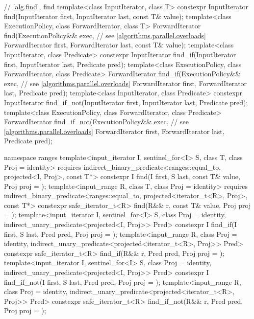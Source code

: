 \begin{codeblock}
{  // \ref{alg.find}, find
  template<class InputIterator, class T>
    constexpr InputIterator find(InputIterator first, InputIterator last,
                                 const T& value);
  template<class ExecutionPolicy, class ForwardIterator, class T>
    ForwardIterator find(ExecutionPolicy&& exec,                // see \ref{algorithms.parallel.overloads}
                         ForwardIterator first, ForwardIterator last,
                         const T& value);
  template<class InputIterator, class Predicate>
    constexpr InputIterator find_if(InputIterator first, InputIterator last,
                                    Predicate pred);
  template<class ExecutionPolicy, class ForwardIterator, class Predicate>
    ForwardIterator find_if(ExecutionPolicy&& exec,             // see \ref{algorithms.parallel.overloads}
                            ForwardIterator first, ForwardIterator last,
                            Predicate pred);
  template<class InputIterator, class Predicate>
    constexpr InputIterator find_if_not(InputIterator first, InputIterator last,
                                        Predicate pred);
  template<class ExecutionPolicy, class ForwardIterator, class Predicate>
    ForwardIterator find_if_not(ExecutionPolicy&& exec,         // see \ref{algorithms.parallel.overloads}
                                ForwardIterator first, ForwardIterator last,
                                Predicate pred);

  namespace ranges {
    template<input_iterator I, sentinel_for<I> S, class T, class Proj = identity>
      requires indirect_binary_predicate<ranges::equal_to, projected<I, Proj>, const T*>
      constexpr I find(I first, S last, const T& value, Proj proj = {});
    template<input_range R, class T, class Proj = identity>
      requires indirect_binary_predicate<ranges::equal_to,
                                         projected<iterator_t<R>, Proj>, const T*>
      constexpr safe_iterator_t<R>
        find(R&& r, const T& value, Proj proj = {});
    template<input_iterator I, sentinel_for<I> S, class Proj = identity,
             indirect_unary_predicate<projected<I, Proj>> Pred>
      constexpr I find_if(I first, S last, Pred pred, Proj proj = {});
    template<input_range R, class Proj = identity,
             indirect_unary_predicate<projected<iterator_t<R>, Proj>> Pred>
      constexpr safe_iterator_t<R>
        find_if(R&& r, Pred pred, Proj proj = {});
    template<input_iterator I, sentinel_for<I> S, class Proj = identity,
             indirect_unary_predicate<projected<I, Proj>> Pred>
      constexpr I find_if_not(I first, S last, Pred pred, Proj proj = {});
    template<input_range R, class Proj = identity,
             indirect_unary_predicate<projected<iterator_t<R>, Proj>> Pred>
      constexpr safe_iterator_t<R>
        find_if_not(R&& r, Pred pred, Proj proj = {});
  }

}
\end{codeblock}
